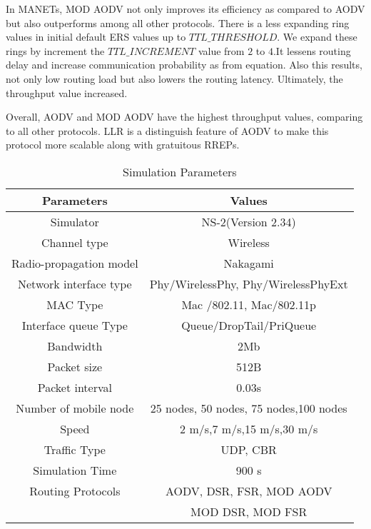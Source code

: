 \documentclass[journal]{IEEEtran}
\begin{document}
In MANETs, MOD AODV not only improves its efficiency as compared to AODV but also outperforms among all other protocols. There is a less expanding ring values in initial default ERS values up to $TTL\_ THRESHOLD$. We expand these rings by increment the $TTL\_INCREMENT$ value from $2$ to $4$.It lessens routing delay and increase communication probability as from equation. Also this results, not only low routing load but also lowers the routing latency. Ultimately, the throughput value increased.

Overall, AODV and MOD AODV have the highest throughput values, comparing to all other protocols. LLR is a distinguish feature of AODV to make this protocol more scalable along with gratuitous RREPs.

\small
\vspace{0.05cm}

\begin{table}[!h]
\caption {Simulation Parameters}
\begin {center}
\begin{tabular}{|c|c|}
\hline
\textbf{Parameters} & \textbf{Values}\\
\hline

Simulator & NS-2(Version 2.34)\\

\hline

Channel type & Wireless  \\
\hline

Radio-propagation model  & Nakagami  \\
\hline

Network interface type & Phy/WirelessPhy, Phy/WirelessPhyExt  \\
 \hline

MAC Type  &Mac /802.11, Mac/802.11p  \\

\hline
Interface queue Type & Queue/DropTail/PriQueue \\
\hline

Bandwidth & 2Mb \\
\hline

Packet size & 512B  \\

\hline

Packet interval & 0.03s\\
\hline

 Number of mobile node & 25 nodes, 50 nodes, 75 nodes,100 nodes \\
\hline

Speed & 2 m/s,7 m/s,15 m/s,30 m/s\\
\hline

Traffic Type & UDP, CBR \\
\hline

Simulation Time & 900 s \\
\hline

Routing Protocols & AODV, DSR, FSR,  MOD AODV  \\
&  MOD DSR, MOD FSR \\
\hline
\end{tabular}
\end{center}
\end{table}
\end{document}
